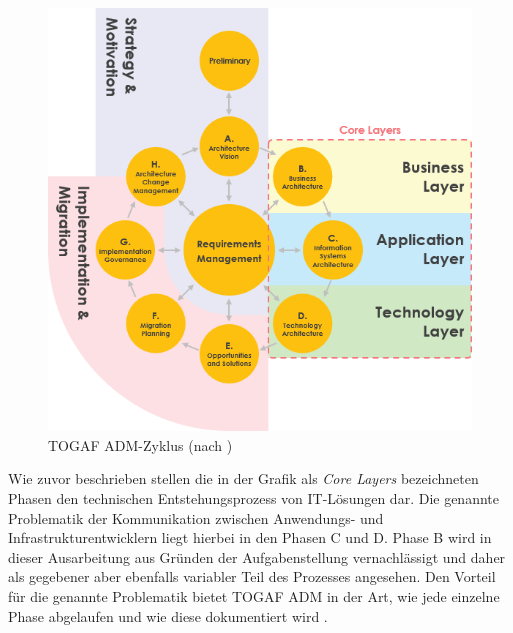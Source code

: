 \begin{figure}[h!]
	\centering
	\includegraphics[width=0.8\linewidth]{img/togaf_adm}
	\caption{TOGAF ADM-Zyklus (nach \cite{VisualParadigmTOGAF})}
	\label{fig:togaf_adm}
\end{figure}

Wie zuvor beschrieben stellen die in der Grafik als \textit{Core Layers} bezeichneten Phasen den technischen Entstehungsprozess von IT-Lösungen dar. Die genannte Problematik der Kommunikation zwischen Anwendungs- und Infrastrukturentwicklern liegt hierbei in den Phasen C und D. Phase B wird in dieser Ausarbeitung aus Gründen der Aufgabenstellung vernachlässigt und daher als gegebener aber ebenfalls variabler Teil des Prozesses angesehen. Den Vorteil für die genannte Problematik bietet TOGAF ADM in der Art, wie jede einzelne Phase abgelaufen und wie diese dokumentiert wird \cite{Skript}\cite{TOGAFDocs}.


